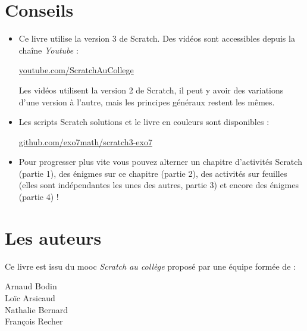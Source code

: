 
\clearemptydoublepage
\pagestyle{empty}\thispagestyle{empty}


\section*{Conseils}

\vspace*{-1ex}

\begin{itemize}
  \item Ce livre utilise la version 3 de Scratch. 
Des vidéos sont accessibles depuis la chaîne \emph{Youtube} :

\centerline{
\href{https://www.youtube.com/c/ScratchAuCollege}{youtube.com/ScratchAuCollege}}

Les vidéos utilisent la version 2 de Scratch, il peut y avoir des variations 
d'une version à l'autre, mais les principes généraux restent les mêmes. 
  
  \item Les scripts Scratch solutions et le livre en couleurs sont disponibles :

  \centerline{\href{https://github.com/exo7math/scratch3-exo7}{github.com/exo7math/scratch3-exo7}}

  \item  Pour progresser plus vite vous pouvez alterner un chapitre  d'activités Scratch (partie 1), des énigmes sur ce chapitre (partie 2), des activités sur feuilles (elles sont indépendantes les unes des autres, partie 3) et encore des énigmes (partie 4) ! 
\end{itemize}




\section*{Les auteurs}

\vspace*{-1ex}

Ce livre est issu du mooc \emph{Scratch au collège} proposé par une équipe formée de :
\begin{center}
Arnaud Bodin\\
Loïc Arsicaud\\
Nathalie Bernard\\
François Recher
\end{center}

\medskip 


